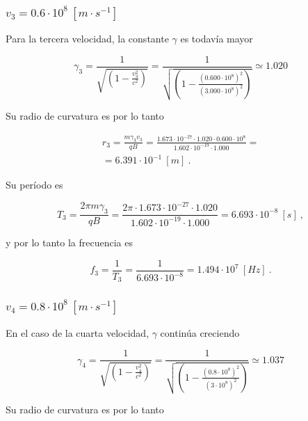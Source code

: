 \documentclass[journal]{IEEEtran}
\begin{document}
\subsubsection{$v_3 = 0.6\cdot 10^8~[m\cdot s^{-1}]$}

Para la tercera velocidad, la constante $\gamma$ es todavía mayor

\begin{equation}
\gamma_3 = \displaystyle\frac{1}{\sqrt{(1-\displaystyle\frac{v_3^2}{c^2})}} = \displaystyle\frac{1}{\sqrt{(1-\displaystyle\frac{(0.600\cdot 10^8)^2}{(3.000\cdot 10^8)^2})}} \simeq 1.020
\end{equation}

Su radio de curvatura es por lo tanto

\begin{align}
r_3 = \displaystyle\frac{m\gamma_3v_3}{qB} = \displaystyle\frac{1.673\cdot 10^{-27}\cdot 1.020 \cdot 0.600\cdot 10^8}{1.602\cdot 10^{-19}\cdot 1.000} = \\
= 6.391\cdot 10^{-1}~[m]~.
\end{align}

Su período es

\begin{equation}
    T_3 = \displaystyle\frac{2\pi m\gamma_3}{qB} = \displaystyle\frac{2\pi \cdot 1.673\cdot 10^{-27}\cdot 1.020}{1.602\cdot 10^{-19}\cdot 1.000} = 6.693\cdot 10^{-8}~[s]~,
\end{equation}

y por lo tanto la frecuencia es

\begin{equation}
f_3 = \displaystyle\frac{1}{T_3} = \displaystyle\frac{1}{6.693\cdot 10^{-8}} = 1.494\cdot 10^7~[Hz]~.
\end{equation}

\subsubsection{$v_4 = 0.8\cdot 10^8~[m\cdot s^{-1}]$}

En el caso de la cuarta velocidad, $\gamma$ continúa creciendo

\begin{equation}
\gamma_4 = \displaystyle\frac{1}{\sqrt{(1-\displaystyle\frac{v_4^2}{c^2})}} = \displaystyle\frac{1}{\sqrt{(1-\displaystyle\frac{(0.8\cdot 10^8)^2}{(3\cdot 10^8)^2})}} \simeq 1.037
\end{equation}

Su radio de curvatura es por lo tanto
\end{document}

